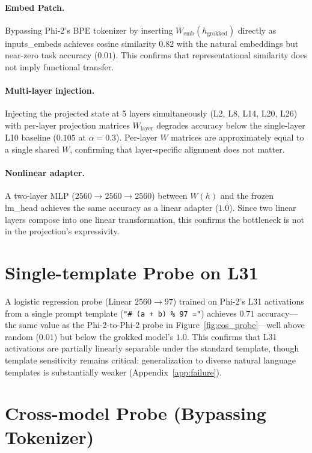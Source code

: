 \documentclass{article}
\begin{document}
\paragraph{Embed Patch.}
Bypassing Phi-2's BPE tokenizer by inserting $W_{\text{emb}}(h_{\text{grokked}})$
directly as inputs\_embeds achieves cosine similarity $0.82$ with the
natural embeddings but near-zero task accuracy ($0.01$).  This confirms
that representational similarity does not imply functional transfer.

\paragraph{Multi-layer injection.}
Injecting the projected state at 5 layers simultaneously (L2, L8, L14, L20,
L26) with per-layer projection matrices $W_{\text{layer}}$ degrades accuracy
below the single-layer L10 baseline ($0.105$ at $\alpha=0.3$).  Per-layer
$W$ matrices are approximately equal to a single shared $W$, confirming
that layer-specific alignment does not matter.

\paragraph{Nonlinear adapter.}
A two-layer MLP ($2560 \rightarrow 2560 \rightarrow 2560$) between $W(h)$
and the frozen lm\_head achieves the same accuracy as a linear adapter
($1.0$).  Since two linear layers compose into one linear transformation,
this confirms the bottleneck is not in the projection's expressivity.

\section{Single-template Probe on L31}
\label{app:probe_final}

A logistic regression probe (Linear $2560 \rightarrow 97$) trained on
Phi-2's L31 activations from a single prompt template
(\texttt{"\# ({a} + {b}) \% 97 ="}) achieves $0.71$ accuracy---the same
value as the Phi-2-to-Phi-2 probe in Figure~\ref{fig:cos_probe}---well above
random ($0.01$) but below the grokked model's $1.0$.
This confirms that L31 activations are partially linearly separable under the
standard template, though template sensitivity remains critical:
generalization to diverse natural language templates is substantially weaker
(Appendix~\ref{app:failure}).

\section{Cross-model Probe (Bypassing Tokenizer)}
\label{app:crossmodel}
\end{document}
